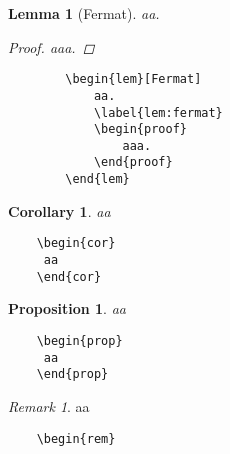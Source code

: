 \documentclass[a4paper,10pt,landscape]{article}
\newtheorem{cor}[thm]{Corollary}
\newtheorem{lem}[thm]{Lemma}
\newtheorem{prop}[thm]{Proposition}
\theoremstyle{definition}
\theoremstyle{remark}
\newtheorem{rem}{Remark}[section]
\begin{document}
\begin{multicols}{3}
\begin{multicols}{2}
	\begin{lem}[Fermat]
		aa.
		\label{lem:fermat}
		\begin{proof}
			aaa.
		\end{proof}
	\end{lem}
\columnbreak
	\begin{verbatim}
		\begin{lem}[Fermat]
			aa.
			\label{lem:fermat}
			\begin{proof}
				aaa.
			\end{proof}
		\end{lem}
	\end{verbatim}
\end{multicols}
\begin{multicols}{2}
	\begin{cor}
		aa
	\end{cor}
\columnbreak
	\begin{verbatim}
	\begin{cor}
	 aa
	\end{cor}
	\end{verbatim}
\end{multicols}
\begin{multicols}{2}
	\begin{prop}
		aa
	\end{prop}
\columnbreak
	\begin{verbatim}
	\begin{prop}
	 aa
	\end{prop}
	\end{verbatim}
\end{multicols}
\begin{multicols}{2}
	\begin{rem}
		aa
	\end{rem}
\columnbreak
	\begin{verbatim}
	\begin{rem}

\end{verbatim}
\end{multicols}
\end{multicols}
\end{document}

